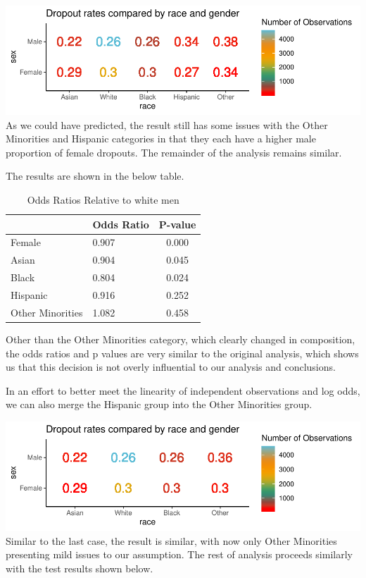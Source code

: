 \documentclass[]{article}
\begin{document}
\includegraphics{Stat_461_Final_Project_Report_files/figure-latex/secondplot2-1.pdf}
As we could have predicted, the result still has some issues with the
Other Minorities and Hispanic categories in that they each have a higher
male proportion of female dropouts. The remainder of the analysis
remains similar.

The results are shown in the below table.

\begin{table}[H]

\caption{\label{tab:odds_ratios3}Odds Ratios Relative to white men}
\centering
\fontsize{12}{14}\selectfont
\begin{tabular}[t]{l|l|c}
\hline
  & Odds Ratio & P-value\\
\hline
Female & 0.907 & 0.000\\
\hline
Asian & 0.904 & 0.045\\
\hline
Black & 0.804 & 0.024\\
\hline
Hispanic & 0.916 & 0.252\\
\hline
Other Minorities & 1.082 & 0.458\\
\hline
\end{tabular}
\end{table}

Other than the Other Minorities category, which clearly changed in
composition, the odds ratios and p values are very similar to the
original analysis, which shows us that this decision is not overly
influential to our analysis and conclusions.

In an effort to better meet the linearity of independent observations
and log odds, we can also merge the Hispanic group into the Other
Minorities group.

\includegraphics{Stat_461_Final_Project_Report_files/figure-latex/secondplot3-1.pdf}
Similar to the last case, the result is similar, with now only Other
Minorities presenting mild issues to our assumption. The rest of
analysis proceeds similarly with the test results shown below.
\end{document}
